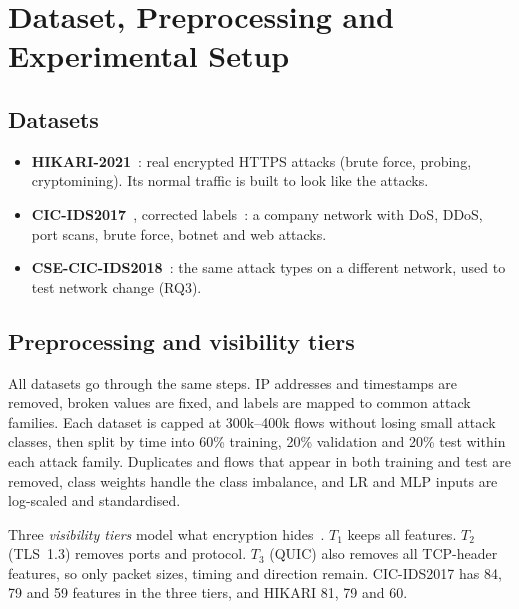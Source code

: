 \section{Dataset, Preprocessing and Experimental Setup}
\label{sec:data}

\subsection{Datasets}
\begin{itemize}[leftmargin=*, itemsep=0pt]
  \item \textbf{HIKARI-2021}~\cite{hikari}: real encrypted HTTPS attacks (brute force, probing, cryptomining). Its normal traffic is built to look like the attacks.
  \item \textbf{CIC-IDS2017}~\cite{cicids2017}, corrected labels~\cite{engelen2021}: a company network with DoS, DDoS, port scans, brute force, botnet and web attacks.
  \item \textbf{CSE-CIC-IDS2018}~\cite{liu2022error}: the same attack types on a different network, used to test network change (RQ3).
\end{itemize}



\subsection{Preprocessing and visibility tiers}
All datasets go through the same steps. IP addresses and timestamps are removed, broken values are fixed, and labels are mapped to common attack families. Each dataset is capped at 300k--400k flows without losing small attack classes, then split by time into 60\% training, 20\% validation and 20\% test within each attack family. Duplicates and flows that appear in both training and test are removed, class weights handle the class imbalance, and LR and MLP inputs are log-scaled and standardised.

Three \emph{visibility tiers} model what encryption hides~\cite{rfc9000}. $T_1$ keeps all features. $T_2$ (TLS~1.3) removes ports and protocol. $T_3$ (QUIC) also removes all TCP-header features, so only packet sizes, timing and direction remain. CIC-IDS2017 has 84, 79 and 59 features in the three tiers, and HIKARI 81, 79 and 60.

